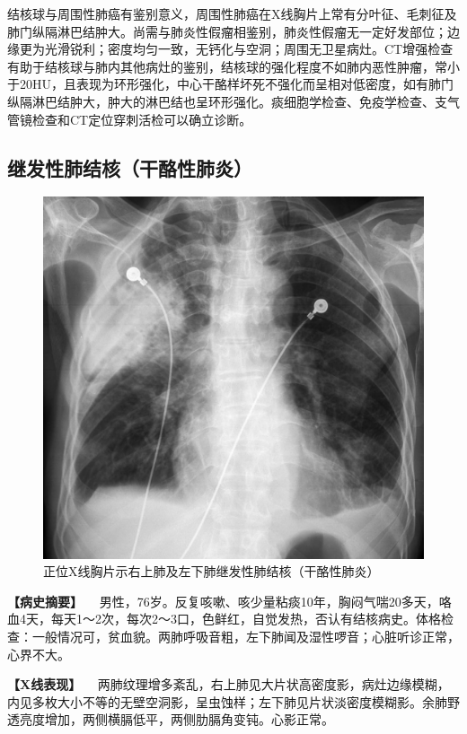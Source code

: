 结核球与周围性肺癌有鉴别意义，周围性肺癌在X线胸片上常有分叶征、毛刺征及肺门纵隔淋巴结肿大。尚需与肺炎性假瘤相鉴别，肺炎性假瘤无一定好发部位；边缘更为光滑锐利；密度均匀一致，无钙化与空洞；周围无卫星病灶。CT增强检查有助于结核球与肺内其他病灶的鉴别，结核球的强化程度不如肺内恶性肿瘤，常小于20HU，且表现为环形强化，中心干酪样坏死不强化而呈相对低密度，如有肺门纵隔淋巴结肿大，肿大的淋巴结也呈环形强化。痰细胞学检查、免疫学检查、支气管镜检查和CT定位穿刺活检可以确立诊断。

\subsection{继发性肺结核（干酪性肺炎）}

\begin{figure}[!htbp]
 \centering
 \includegraphics{./images/Image00159.jpg}
 \captionsetup{justification=centering}
 \caption{正位X线胸片示右上肺及左下肺继发性肺结核（干酪性肺炎）}
 \label{fig3-5-7}
  \end{figure} 

\textbf{【病史摘要】}
　男性，76岁。反复咳嗽、咳少量粘痰10年，胸闷气喘20多天，咯血4天，每天1～2次，每次2～3口，色鲜红，自觉发热，否认有结核病史。体格检查：一般情况可，贫血貌。两肺呼吸音粗，左下肺闻及湿性啰音；心脏听诊正常，心界不大。

\textbf{【X线表现】}
　两肺纹理增多紊乱，右上肺见大片状高密度影，病灶边缘模糊，内见多枚大小不等的无壁空洞影，呈虫蚀样；左下肺见片状淡密度模糊影。余肺野透亮度增加，两侧横膈低平，两侧肋膈角变钝。心影正常。

